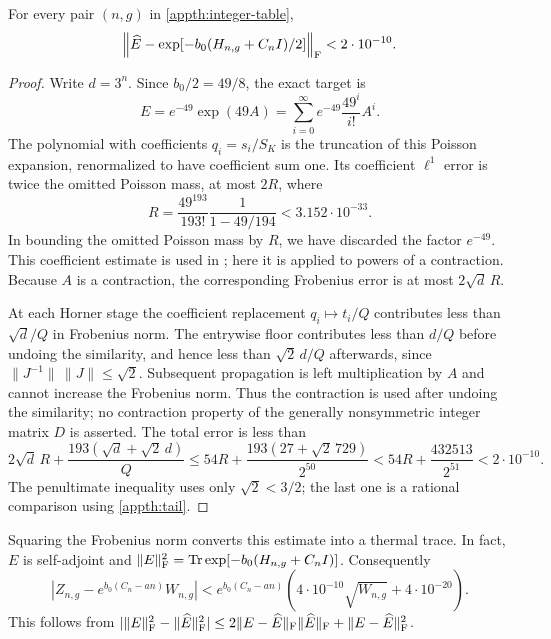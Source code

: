\begin{lemma}\label{appth:matrix-error}
For every pair $(n,g)$ in \eqref{appth:integer-table},
\[
 \left\|\widehat E-\exp[-b_0(H_{n,g}+C_nI)/2]\right\|_{\rm F}
       <2\cdot10^{-10}.
\]
\end{lemma}

\begin{proof}
Write $d=3^n$. Since $b_0/2=49/8$, the exact target is
\[
 E=e^{-49}\exp(49A)=\sum_{i=0}^{\infty}
                         e^{-49}\frac{49^i}{i!}A^i.
\]
The polynomial with coefficients $q_i=s_i/S_K$ is the truncation of this
Poisson expansion, renormalized to have coefficient sum one. Its coefficient
$\ell^1$ error is twice the omitted Poisson mass, at most $2R$, where
\begin{equation}\label{appth:tail}
R=\frac{49^{193}}{193!}\frac1{1-49/194}<3.152\cdot10^{-33}.
\end{equation}
In bounding the omitted Poisson mass by $R$, we have discarded the
factor $e^{-49}$. This coefficient estimate is used in
\cite[proof of Proposition 1]{FoxGlynn1988}; here it is applied to
powers of a contraction.
Because $A$ is a contraction, the corresponding Frobenius error is at most
$2\sqrt d\,R$.

At each Horner stage the coefficient replacement $q_i\mapsto t_i/Q$
contributes less than $\sqrt d/Q$ in Frobenius norm. The entrywise floor
contributes less than $d/Q$ before undoing the similarity, and hence less
than $\sqrt2\,d/Q$ afterwards, since
$\|J^{-1}\|\,\|J\|\le\sqrt2$. Subsequent propagation is left
multiplication by $A$ and cannot increase the Frobenius norm. Thus the
contraction is used after undoing the similarity; no contraction
property of the generally nonsymmetric integer matrix $D$ is asserted.
The total error is less than
\begin{equation}\label{appth:frobenius-error}
 2\sqrt d\,R+\frac{193(\sqrt d+\sqrt2\,d)}{Q}
 \le54R+\frac{193(27+\sqrt2\,729)}{2^{50}}
 <54R+\frac{432513}{2^{51}}<2\cdot10^{-10}.
\end{equation}
The penultimate inequality uses only $\sqrt2<3/2$; the last one is a
rational comparison using \eqref{appth:tail}.
\end{proof}

Squaring the Frobenius norm converts this estimate into a thermal trace.
In fact, $E$ is self-adjoint and
$\|E\|_{\rm F}^2=\operatorname{Tr}\exp[-b_0(H_{n,g}+C_nI)]$. Consequently
\begin{equation}\label{appth:partition-error}
 \left|Z_{n,g}-e^{b_0(C_n-an)}W_{n,g}\right|
 <e^{b_0(C_n-an)}
        \left(4\cdot10^{-10}\sqrt{W_{n,g}}+4\cdot10^{-20}\right).
\end{equation}
This follows from
$|\|E\|_{\rm F}^2-\|\widehat E\|_{\rm F}^2|
\le2\|E-\widehat E\|_{\rm F}\|\widehat E\|_{\rm F}
     +\|E-\widehat E\|_{\rm F}^2$.


